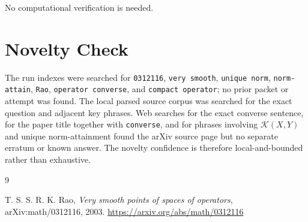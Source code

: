 \documentclass[11pt]{article}
\newcommand{\calK}{\mathcal K}
\begin{document}
No computational verification is needed.

\section*{Novelty Check}

The run indexes were searched for \texttt{0312116}, \texttt{very smooth},
\texttt{unique norm}, \texttt{norm-attain}, \texttt{Rao},
\texttt{operator converse}, and \texttt{compact operator}; no prior packet
or attempt was found. The local parsed source corpus was searched for the
exact question and adjacent key phrases. Web searches for the exact converse
sentence, for the paper title together with \texttt{converse}, and for
phrases involving \(\calK(X,Y)\) and unique norm-attainment found the arXiv
source page but no separate erratum or known answer. The novelty confidence
is therefore local-and-bounded rather than exhaustive.

\begin{thebibliography}{9}

T. S. S. R. K. Rao,
\emph{Very smooth points of spaces of operators},
arXiv:math/0312116, 2003.
\url{https://arxiv.org/abs/math/0312116}

\end{thebibliography}
\end{document}
